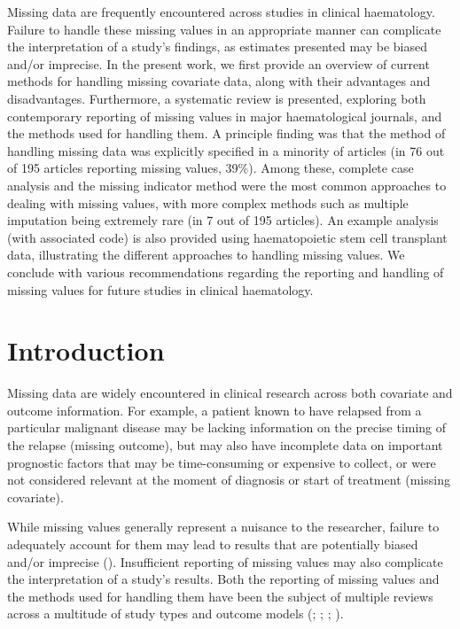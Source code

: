 \documentclass[
  letterpaper,
  paper=240mm:170mm,
  twoside=true,
  open=right,
  fontsize=10pt,
  pagesize=false,
  BCOR=15mm,
  DIV=14,
  headinclude=true,
  footinclude=false,
  headsepline=on]{scrbook}
\begin{document}

Missing data are frequently encountered across studies in clinical
haematology. Failure to handle these missing values in an appropriate
manner can complicate the interpretation of a study's findings, as
estimates presented may be biased and/or imprecise. In the present work,
we first provide an overview of current methods for handling missing
covariate data, along with their advantages and disadvantages.
Furthermore, a systematic review is presented, exploring both
contemporary reporting of missing values in major haematological
journals, and the methods used for handling them. A principle finding
was that the method of handling missing data was explicitly specified in
a minority of articles (in 76 out of 195 articles reporting missing
values, 39\%). Among these, complete case analysis and the missing
indicator method were the most common approaches to dealing with missing
values, with more complex methods such as multiple imputation being
extremely rare (in 7 out of 195 articles). An example analysis (with
associated code) is also provided using haematopoietic stem cell
transplant data, illustrating the different approaches to handling
missing values. We conclude with various recommendations regarding the
reporting and handling of missing values for future studies in clinical
haematology.

\clearpage

\section{Introduction}\label{introduction}

Missing data are widely encountered in clinical research across both
covariate and outcome information. For example, a patient known to have
relapsed from a particular malignant disease may be lacking information
on the precise timing of the relapse (missing outcome), but may also
have incomplete data on important prognostic factors that may be
time-consuming or expensive to collect, or were not considered relevant
at the moment of diagnosis or start of treatment (missing covariate).

While missing values generally represent a nuisance to the researcher,
failure to adequately account for them may lead to results that are
potentially biased and/or imprecise
(). Insufficient reporting of missing values may also
complicate the interpretation of a study's results. Both the reporting
of missing values and the methods used for handling them have been the
subject of multiple reviews across a multitude of study types and
outcome models (; ; ; ).
\end{document}
